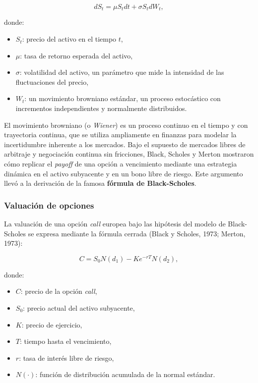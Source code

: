 \documentclass[11pt,a4paper,spanish]{article}
\numberwithin{equation}{section} %
\begin{document}
\begin{equation}
dS_t = \mu S_t dt + \sigma S_t dW_t,
\end{equation}

donde:
\begin{itemize}
    \item $S_t$: precio del activo en el tiempo $t$,
    \item $\mu$: tasa de retorno esperada del activo,
    \item $\sigma$: volatilidad del activo, un parámetro que mide la intensidad de las fluctuaciones del precio,
    \item $W_t$: un movimiento browniano estándar, un proceso estocástico con incrementos independientes y normalmente distribuidos.
\end{itemize}

El movimiento browniano (o \textit{Wiener}) es un proceso continuo en el tiempo y con trayectoria continua, que se utiliza ampliamente en finanzas para modelar la incertidumbre inherente a los mercados. Bajo el supuesto de mercados libres de arbitraje y negociación continua sin fricciones, Black, Scholes y Merton mostraron cómo replicar el \textit{payoff} de una opción a vencimiento mediante una estrategia dinámica en el activo subyacente y en un bono libre de riesgo. Este argumento llevó a la derivación de la famosa \textbf{fórmula de Black-Scholes}.

\subsubsection{Valuación de opciones}

La valuación de una opción \textit{call} europea bajo las hipótesis del modelo de Black-Scholes se expresa mediante la fórmula cerrada (Black y Scholes, 1973; Merton, 1973):

\begin{equation}
C = S_0 N(d_1) - K e^{-rT} N(d_2),
\end{equation}

donde:
\begin{itemize}
    \item $C$: precio de la opción \textit{call},
    \item $S_0$: precio actual del activo subyacente,
    \item $K$: precio de ejercicio,
    \item $T$: tiempo hasta el vencimiento,
    \item $r$: tasa de interés libre de riesgo,
    \item $N(\cdot)$: función de distribución acumulada de la normal estándar.
\end{itemize}
\end{document}
